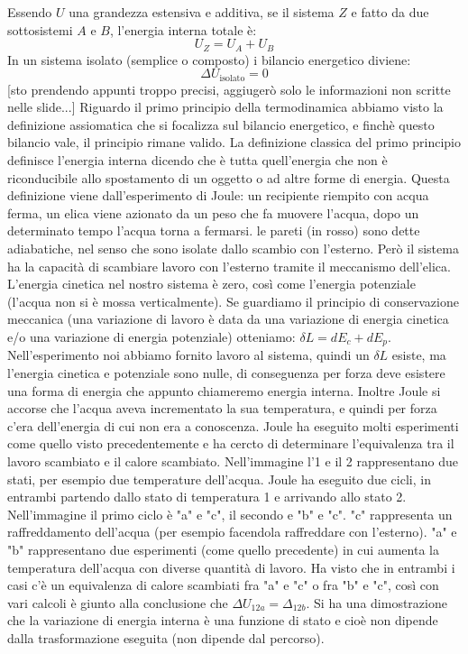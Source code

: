 Essendo $U$ una grandezza estensiva e additiva, se il sistema $Z$ e fatto da due sottosistemi $A$ e $B$, l'energia interna totale è: 
\[
    U_Z = U_A + U_B
\]
In un sistema isolato (semplice o composto) i bilancio energetico diviene:
\[
    \Delta U_{\text{isolato}} = 0
\]
[sto prendendo appunti troppo precisi, aggiugerò solo le informazioni non scritte nelle slide...]
\newline[8]
\newline[9] Riguardo il primo principio della termodinamica abbiamo visto la definizione assiomatica che si focalizza sul bilancio energetico, e finchè questo bilancio vale, il principio rimane valido. La definizione classica del primo principio definisce l'energia interna dicendo che è tutta quell'energia che non è riconducibile allo spostamento di un oggetto o ad altre forme di energia. Questa definizione viene dall'esperimento di Joule: un recipiente riempito con acqua ferma, un elica viene azionato da un peso che fa muovere l'acqua, dopo un determinato tempo l'acqua torna a fermarsi.
\newline[10] le pareti (in rosso) sono dette adiabatiche, nel senso che sono isolate dallo scambio con l'esterno. Però il sistema ha la capacità di scambiare lavoro con l'esterno tramite il meccanismo dell'elica. L'energia cinetica nel nostro sistema è zero, così come l'energia potenziale (l'acqua non si è mossa verticalmente). Se guardiamo il principio di conservazione meccanica (una variazione di lavoro è data da una variazione di energia cinetica e/o una variazione di energia potenziale) otteniamo: $\delta L = d E_c + dE_p$. Nell'esperimento noi abbiamo fornito lavoro al sistema, quindi un $\delta L$ esiste, ma l'energia cinetica e potenziale sono nulle, di conseguenza per forza deve esistere una forma di energia che appunto chiameremo energia interna. Inoltre Joule si accorse che l'acqua aveva incrementato la sua temperatura, e quindi per forza c'era dell'energia di cui non era a conoscenza.
\newline[11] Joule ha eseguito molti esperimenti come quello visto precedentemente e ha cercto di determinare l'equivalenza tra il lavoro scambiato e il calore scambiato. Nell'immagine l'1 e il 2 rappresentano due stati, per esempio due temperature dell'acqua. Joule ha eseguito due cicli, in entrambi partendo dallo stato di temperatura 1 e arrivando allo stato 2. Nell'immagine il primo ciclo è "a" e "c", il secondo e "b" e "c". "c" rappresenta un raffreddamento dell'acqua (per esempio facendola raffreddare con l'esterno). "a" e "b" rappresentano due esperimenti (come quello precedente) in cui aumenta la temperatura dell'acqua con diverse quantità di lavoro. Ha visto che in entrambi i casi c'è un equivalenza di calore scambiati fra "a" e "c" o fra "b" e "c", così con vari calcoli è giunto alla conclusione che $\Delta U_{12a} = \Delta_{12b}$. Si ha una dimostrazione che la variazione di energia interna è una funzione di stato e cioè non dipende dalla trasformazione eseguita (non dipende dal percorso).
